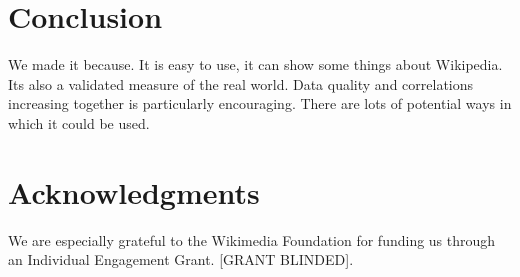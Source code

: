 \documentclass[letterpaper]{article}
\begin{document}
\section{Conclusion}
We made it because. It is easy to use, it can show some things about Wikipedia. Its also a validated measure of the real world. Data quality and correlations increasing together is particularly encouraging. There are lots of potential ways in which it could be used.	


\section{ Acknowledgments}
We are especially grateful to the Wikimedia Foundation for funding us through an Individual Engagement Grant. [GRANT BLINDED].



\end{document}

